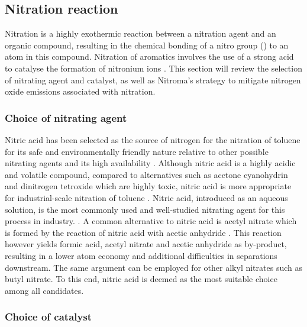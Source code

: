 \subsection{Nitration reaction}

Nitration is a highly exothermic reaction between a nitration agent and an organic compound, resulting in the chemical bonding of a nitro group () to an atom in this compound. Nitration of aromatics involves the use of a strong acid to catalyse the formation of nitronium ions . This section will review the selection of nitrating agent and catalyst, as well as Nitroma's strategy to mitigate nitrogen oxide emissions associated with nitration.

\subsubsection{Choice of nitrating agent}

Nitric acid has been selected as the source of nitrogen for the nitration of toluene for its safe and environmentally friendly nature relative to other possible nitrating agents and its high availability \cite{miller_kinetics_1964, sreedhar_scientific_2013}. Although nitric acid is a highly acidic and volatile compound, compared to alternatives such as acetone cyanohydrin and dinitrogen tetroxide which are highly toxic, nitric acid is more appropriate for industrial-scale nitration of toluene \cite{dagade_nitration_2002, sreedhar_scientific_2013}. Nitric acid, introduced as an aqueous solution, is the most commonly used and well-studied nitrating agent for this process in industry. \cite{bowers_toluidines_2000}. A common alternative to nitric acid is acetyl nitrate which is formed by the reaction of nitric acid with acetic anhydride \cite{vassena_selective_1999}. This reaction however yields formic acid, acetyl nitrate and acetic anhydride as by-product, resulting in a lower atom economy and additional difficulties in separations downstream. The same argument can be employed for other alkyl nitrates such as butyl nitrate. To this end, nitric acid is deemed as the most suitable choice among all candidates.

\subsubsection{Choice of catalyst}

